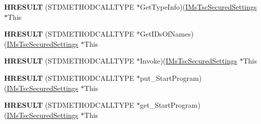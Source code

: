 \begin{DoxyCompactItemize}
\item 
\mbox{\label{struct_m_s_t_s_c_lib_1_1_i_ms_tsc_secured_settings_vtbl_ab4af1b3677538ac3c05523cfd4d6237c}} 
{\bfseries H\+R\+E\+S\+U\+LT} (S\+T\+D\+M\+E\+T\+H\+O\+D\+C\+A\+L\+L\+T\+Y\+PE $\ast$Get\+Type\+Info)(\hyperlink{interface_m_s_t_s_c_lib_1_1_i_ms_tsc_secured_settings}{I\+Ms\+Tsc\+Secured\+Settings} $\ast$This
\item 
\mbox{\label{struct_m_s_t_s_c_lib_1_1_i_ms_tsc_secured_settings_vtbl_a738ef2f3d501d8c2fd453b954c0b6681}} 
{\bfseries H\+R\+E\+S\+U\+LT} (S\+T\+D\+M\+E\+T\+H\+O\+D\+C\+A\+L\+L\+T\+Y\+PE $\ast$Get\+I\+Ds\+Of\+Names)(\hyperlink{interface_m_s_t_s_c_lib_1_1_i_ms_tsc_secured_settings}{I\+Ms\+Tsc\+Secured\+Settings} $\ast$This
\item 
\mbox{\label{struct_m_s_t_s_c_lib_1_1_i_ms_tsc_secured_settings_vtbl_a0e28257317f9d35c79c76c1ee4b8e603}} 
{\bfseries H\+R\+E\+S\+U\+LT} (S\+T\+D\+M\+E\+T\+H\+O\+D\+C\+A\+L\+L\+T\+Y\+PE $\ast$Invoke)(\hyperlink{interface_m_s_t_s_c_lib_1_1_i_ms_tsc_secured_settings}{I\+Ms\+Tsc\+Secured\+Settings} $\ast$This
\item 
\mbox{\label{struct_m_s_t_s_c_lib_1_1_i_ms_tsc_secured_settings_vtbl_aadd8a8ef81576817afff1ca044e788e8}} 
{\bfseries H\+R\+E\+S\+U\+LT} (S\+T\+D\+M\+E\+T\+H\+O\+D\+C\+A\+L\+L\+T\+Y\+PE $\ast$put\+\_\+\+Start\+Program)(\hyperlink{interface_m_s_t_s_c_lib_1_1_i_ms_tsc_secured_settings}{I\+Ms\+Tsc\+Secured\+Settings} $\ast$This
\item 
\mbox{\label{struct_m_s_t_s_c_lib_1_1_i_ms_tsc_secured_settings_vtbl_a19177283ba5ae2ac64a344419c90be2a}} 
{\bfseries H\+R\+E\+S\+U\+LT} (S\+T\+D\+M\+E\+T\+H\+O\+D\+C\+A\+L\+L\+T\+Y\+PE $\ast$get\+\_\+\+Start\+Program)(\hyperlink{interface_m_s_t_s_c_lib_1_1_i_ms_tsc_secured_settings}{I\+Ms\+Tsc\+Secured\+Settings} $\ast$This
\item 
\mbox{\label{struct_m_s_t_s_c_lib_1_1_i_ms_tsc_secured_settings_vtbl_ad1a3c1bf8879648107280cff3d2774b1}} 

\end{DoxyCompactItemize}
